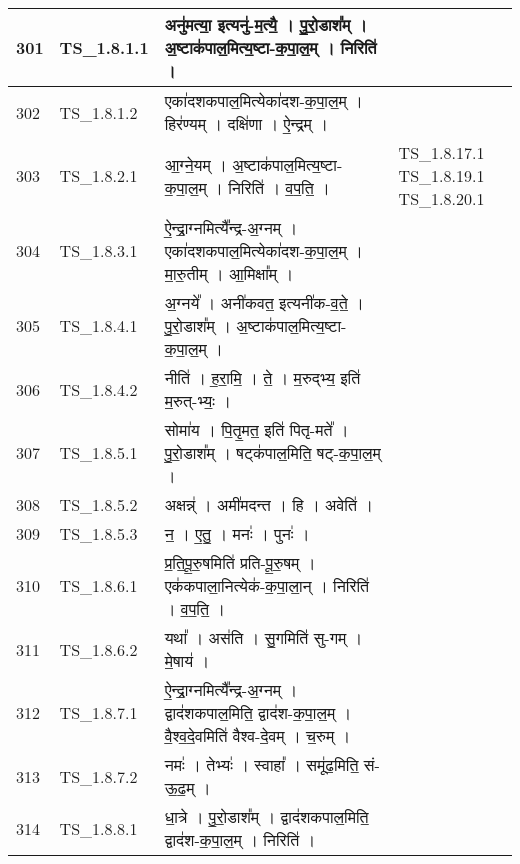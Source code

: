 \documentclass[17pt]{extarticle}
\begin{document}
\begin{longtable}{||p{0.4in}||p{0.9in}||p{4.0in}||p{0.9in}||}
        \hline
            301 & TS\_1.8.1.1 & अनु॑मत्या॒ इत्यनु॑{-}म॒त्यै॒   ।   पु॒रो॒डाश᳚म्   ।   अ॒ष्टाक॑पाल॒मित्य॒ष्टा{-}क॒पा॒ल॒म्   ।   निरिति॑   ।    &      \\
        \hline
            302 & TS\_1.8.1.2 & एका॑दशकपाल॒मित्येका॑दश{-}क॒पा॒ल॒म्   ।   हिर॑ण्यम्   ।   दक्षि॑णा   ।   ऐ॒न्द्रम्   ।    &      \\
        \hline
            303 & TS\_1.8.2.1 & आ॒ग्ने॒यम्   ।   अ॒ष्टाक॑पाल॒मित्य॒ष्टा{-}क॒पा॒ल॒म्   ।   निरिति॑   ।   व॒प॒ति॒   ।    &  TS\_1.8.17.1 TS\_1.8.19.1 TS\_1.8.20.1       \\
        \hline
            304 & TS\_1.8.3.1 & ऐ॒न्द्रा॒ग्नमित्यै᳚न्द्र{-}अ॒ग्नम्   ।   एका॑दशकपाल॒मित्येका॑दश{-}क॒पा॒ल॒म्   ।   मा॒रु॒तीम्   ।   आ॒मिक्षा᳚म्   ।    &      \\
        \hline
            305 & TS\_1.8.4.1 & अ॒ग्नये᳚   ।   अनी॑कवत॒ इत्यनी॑क{-}व॒ते॒   ।   पु॒रो॒डाश᳚म्   ।   अ॒ष्टाक॑पाल॒मित्य॒ष्टा{-}क॒पा॒ल॒म्   ।    &      \\
        \hline
            306 & TS\_1.8.4.2 & नीति॑   ।   ह॒रा॒मि॒   ।   ते॒   ।   म॒रुद्भ्य॒ इति॑ म॒रुत्{-}भ्यः॒   ।    &      \\
        \hline
            307 & TS\_1.8.5.1 & सोमा॑य   ।   पि॒तृ॒मत॒ इति॑ पितृ{-}मते᳚   ।   पु॒रो॒डाश᳚म्   ।   षट्क॑पाल॒मिति॒ षट्{-}क॒पा॒ल॒म्   ।    &      \\
        \hline
            308 & TS\_1.8.5.2 & अक्षन्न्॑   ।   अमी॑मदन्त   ।   हि   ।   अवेति॑   ।    &      \\
        \hline
            309 & TS\_1.8.5.3 & न॒   ।   ए॒तु॒   ।   मनः॑   ।   पुनः॑   ।    &      \\
        \hline
            310 & TS\_1.8.6.1 & प्र॒ति॒पू॒रु॒षमिति॑ प्रति{-}पू॒रु॒षम्   ।   एक॑कपाला॒नित्येक॑{-}क॒पा॒ला॒न्   ।   निरिति॑   ।   व॒प॒ति॒   ।    &      \\
        \hline
            311 & TS\_1.8.6.2 & यथा᳚   ।   अस॑ति   ।   सु॒गमिति॑ सु{-}गम्   ।   मे॒षाय॑   ।    &      \\
        \hline
            312 & TS\_1.8.7.1 & ऐ॒न्द्रा॒ग्नमित्यै᳚न्द्र{-}अ॒ग्नम्   ।   द्वाद॑शकपाल॒मिति॒ द्वाद॑श{-}क॒पा॒ल॒म्   ।   वै॒श्व॒दे॒वमिति॑ वैश्व{-}दे॒वम्   ।   च॒रुम्   ।    &      \\
        \hline
            313 & TS\_1.8.7.2 & नमः॑   ।   तेभ्यः॑   ।   स्वाहा᳚   ।   समू॑ढ॒मिति॒ सं{-}ऊ॒ढ॒म्   ।    &      \\
        \hline
            314 & TS\_1.8.8.1 & धा॒त्रे   ।   पु॒रो॒डाश᳚म्   ।   द्वाद॑शकपाल॒मिति॒ द्वाद॑श{-}क॒पा॒ल॒म्   ।   निरिति॑   ।    &      \\

\end{longtable}
\end{document}
